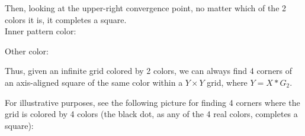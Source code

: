\documentclass[11pt]{article}
\newcommand*{\scalePic}{0.4}
\newcommand*{\gridArg}[7]{%
    \foreach \x in {\fpeval{#1},\fpeval{#1+#2},...,\fpeval{#3+0.0001}} %
        \draw [black, thin, #7] (\x,\fpeval{#4}) -- (\x,\fpeval{#6+0.0001});
    \foreach \y in {\fpeval{#4},\fpeval{#4+#5},...,\fpeval{#6+0.0001}}
        \draw [black, thin, #7] (\fpeval{#1},\y) -- (\fpeval{#3+0.0001},\y);
}
\newcommand*{\grid}[6]{\gridArg{#1}{#2}{#3}{#4}{#5}{#6}{}}%
\newcommand*{\mybigbox}[4]{\grid{#1}{#3}{#1+#3}{#2}{#4}{#2+#4}} %
\newcommand*{\point}[3]{\node at (#1 + 0.5, #2 + 0.5)[circle, fill, inner sep=\scalePic*5pt, #3]{}; \gridArg{#1}{1}{#1+1}{#2}{1}{#2+1}{draw=none}}
\newcommand*{\red}{red!80!blue}
\newcommand*{\blue}{blue!60!green}
\newcommand{\echoWithinShell}[1]{ ( echo \\\\\\\\begin\\{lstlisting\\}\\[breaklines\\] && echo #1 && echo \\\\\\\\end\\{lstlisting\\} ) }
\newcommand{\shellRun}[2] {%
   && \echoWithinShell{\\ #1} && \echoWithinShell{\\ $OUTPUT} ) }%
}
\newcommand{\cppRun}[2]{%
  \shellRun{#1 #2}{run}
}
\begin{document}
Then, looking at the upper-right convergence point, no matter which of the 2 colors it is, it completes a square.\\

Inner pattern color:
\begin{center}
\end{center}

\pagebreak
Other color:
\begin{center}
\end{center}

Thus, given an infinite grid colored by 2 colors, we can always find 4 corners of an axis-aligned square of the same color within a $Y \times Y$ grid, where $Y = X * G_{2}$.

For illustrative purposes, see the following picture for finding 4 corners where the grid is colored by 4 colors (the black dot, as any of the 4 real colors, completes a square):
\begin{center}
\end{center}
\end{document}

